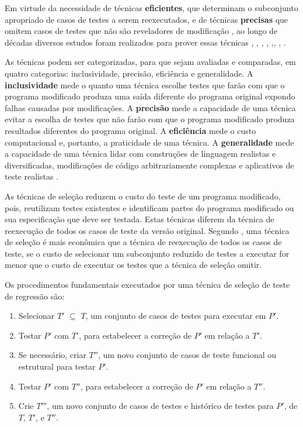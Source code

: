 Em virtude da necessidade de técnicas \textbf{eficientes}, que determinam o subconjunto apropriado de casos de testes a serem reexecutados, e de técnicas \textbf{precisas} que omitem casos de testes que não são reveladores de modificação \cite{Ammann:2008:IST:1355340}, ao longo de décadas diversos estudos foram realizados para prover essas técnicas \cite{WHITE1991}, \cite{Graves:2001:ESR:367008.367020}, \cite{630875}, \cite{536955}, \cite{ENGSTROM201014},\cite{ENGSTROM201014}, \cite{KAZMI2017}, \cite{ROMANO201862}.

As técnicas podem ser categorizadas, para que sejam avaliadas e comparadas, em quatro categorias: inclusividade, precisão, eficiência e generalidade. A \textbf{inclusividade} mede o quanto uma técnica escolhe testes que farão com que o programa modificado produza uma saída diferente do programa original expondo falhas causadas por modificações. A \textbf{precisão} mede a capacidade de uma técnica evitar a escolha de testes que não farão com que o programa modificado produza resultados diferentes do programa original. A \textbf{eficiência} mede o custo computacional e, portanto, a praticidade de uma técnica. A \textbf{generalidade} mede a capacidade de uma técnica lidar com construções de linguagem realistas e diversificadas, modificações de código arbitrariamente complexas e aplicativos de teste realistas \cite{536955}.

As técnicas de seleção reduzem o custo do teste de um programa modificado, pois, reutilizam testes existentes e identificam partes do programa modificado ou sua especificação que deve ser testada. Estas técnicas diferem da técnica de reexecução de todos os casos de teste da versão original. Segundo \cite{WHITE1991}, uma técnica de seleção é mais econômica que a técnica de reexecução de todos os casos de teste, se o custo de selecionar um subconjunto reduzido de testes a executar for menor que o custo de executar os testes que a técnica de seleção omitir.

Os procedimentos fundamentais executados por uma técnica de seleção de teste de regressão são: \cite{536955}

\begin{enumerate}
    \item Selecionar $T'$ $\subseteq$ $T$, um conjunto de casos de testes para executar em $P'$.
    \item Testar $P'$ com $T'$, para estabelecer a correção de $P'$ em relação a $T'$.
    \item Se necessário, criar $T''$, um novo conjunto de casos de teste funcional ou estrutural para testar $P'$.
    \item Testar $P'$ com $T''$, para estabelecer a correção de $P'$ em relação a $T''$.
    \item Crie $T'''$, um novo conjunto de casos de testes e histórico de testes para $P'$, de $T$, $T'$, e $T''$.
\end{enumerate}

